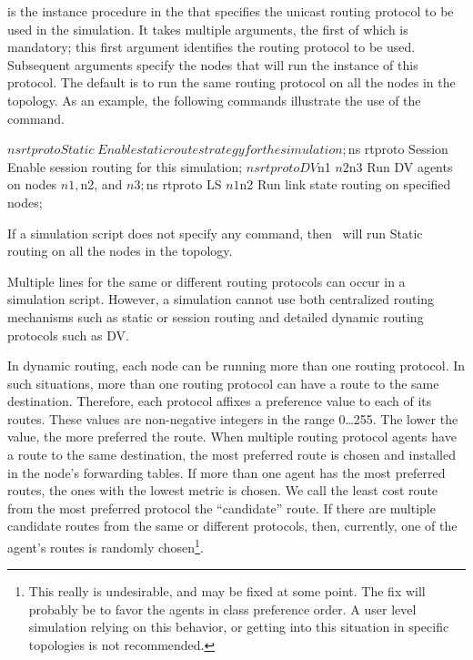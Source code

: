 is the instance procedure in the 
that specifies the unicast routing protocol to be used in the simulation.
It takes multiple arguments, the first of which is mandatory;
this first argument identifies the routing protocol to be used.
Subsequent arguments specify the nodes
that will run the instance of this protocol.
The default is to run the same routing protocol
on all the nodes in the topology.
As an example, the following commands illustrate the use of the
 command.
\begin{program}
        $ns rtproto Static            \; Enable static route strategy for the simulation;
        $ns rtproto Session           \; Enable session routing for this simulation;
        $ns rtproto DV $n1 $n2 $n3    \; Run DV agents on nodes $n1, $n2, and $n3;
        $ns rtproto LS $n1 $n2        \; Run link state routing on specified nodes;
\end{program}
If a simulation script does not specify any  command,
then \ns\ will run Static routing on all the nodes in the topology.

Multiple  lines for the same or different routing 
protocols can occur in a simulation script.
However, a simulation cannot use both
centralized routing mechanisms such as static or session routing and 
detailed dynamic routing protocols such as DV.

In dynamic routing, each node can be running more than one routing protocol.
In such situations, more than one routing protocol can have a route to the
same destination.
Therefore, each protocol affixes a preference value to each of its routes.
These values are non-negative integers in the range 0\ldots255.
The lower the value, the more preferred the route.
When multiple routing protocol agents have a route to the same destination,
the most preferred route is chosen and
installed in the node's forwarding tables.
If more than one agent has the most preferred routes,
the ones with the lowest metric is chosen.
We call the least cost route from the most preferred protocol the
``candidate'' route.
If there are multiple candidate routes from the same or different protocols,
then, currently,
one of the agent's routes is randomly chosen\footnote{
This really is undesirable, and may be fixed at some point.
The fix will probably be to favor the agents in class preference order.
A user level simulation relying on this behavior,
or getting into this situation in specific topologies is
not recommended.}.

